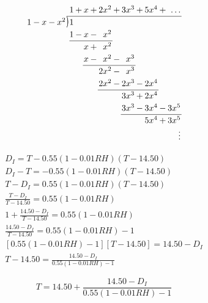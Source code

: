 \documentclass{article}
\newcommand{\longdiv}{\smash{\mkern-0.43mu\vstretch{1.31}{\hstretch{.7}{)}}\mkern-5.2mu\vstretch{1.31}{\hstretch{.7}{)}}}}
\begin{document}
\[
\arraycolsep=1pt
\renewcommand\arraystretch{1.2}
\begin{array}{*1r @{\hskip\arraycolsep}c@{\hskip\arraycolsep} *{11}r}
	&          & 1 & + & x & + & 2x^2 & + & 3x^3 & + & 5x^4 & + & \dots  \\
	\cline{2-13}
	1-x-x^2 & \longdiv & 1 &   &   &   &      &   &      &   &      &   &        \\
	&          & 1 & - & x & - &  x^2 &   &      &   &      &   &        \\
	\cline{3-7}
	&          &   &   & x & + &  x^2 &   &      &   &      &   &        \\
	&          &   &   & x & - &  x^2 & - &  x^3 &   &      &   &        \\
	\cline{5-9}
	&          &   &   &   &   & 2x^2 & - &  x^3 &   &      &   &        \\
	&          &   &   &   &   & 2x^2 & - & 2x^3 & - & 2x^4 &   &        \\
	\cline{7-11}
	&          &   &   &   &   &      &   & 3x^3 & + & 2x^4 &   &        \\
	&          &   &   &   &   &      &   & 3x^3 & - & 3x^4 & - & 3x^5   \\
	\cline{9-13}
	&          &   &   &   &   &      &   &      &   & 5x^4 & + & 3x^5   \\
	&          &   &   &   &   &      &   &      &   &      &   & \vdots \\
\end{array}
\]

\newpage

\begin{align}
	D_I = T - 0.55(1 - 0.01RH)(T-14.50) \nonumber  \\
	D_I - T = -0.55(1 - 0.01RH)(T-14.50) \nonumber \\
	T - D_I = 0.55(1 - 0.01RH)(T-14.50) \nonumber \\
	\frac{T - D_I}{T - 14.50} = 0.55(1 - 0.01RH) \nonumber \\
	1 + \frac{14.50 - D_I}{T - 14.50}  = 0.55(1 - 0.01RH) \nonumber \\
	\frac{14.50 - D_I}{T - 14.50} = 0.55(1 - 0.01RH) - 1 \nonumber \\
	\left[ 0.55(1 - 0.01RH) - 1 \right] \left[ T - 14.50 \right] = 14.50 - D_I \nonumber \\
	T - 14.50 = \frac{14.50 - D_I}{0.55(1 - 0.01RH) - 1} \nonumber
\end{align}

\begin{tcolorbox}[colback=red!5!white,colframe=red!75!black,arc=0mm,boxrule=0mm,width=(\linewidth+0.5cm)]
	\begin{equation}
		T = 14.50 + \frac{14.50 - D_I}{0.55(1 - 0.01RH) - 1} \nonumber
	\end{equation}
\end{tcolorbox}
\end{document}
